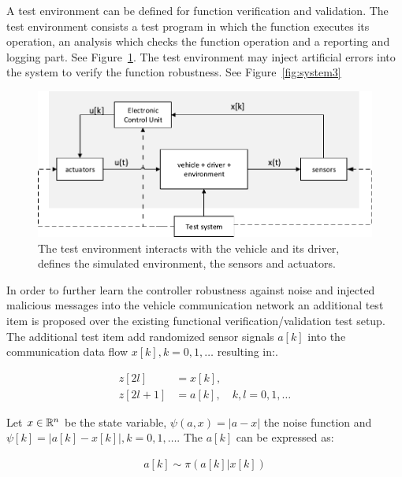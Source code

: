 \documentclass[a4paper, fleqn]{template/cas-dc}
\begin{document}
	A test environment can be defined for function verification and validation. The test environment consists a test program in which the function executes its operation, an analysis which checks the function operation and a reporting and logging part. See Figure~\ref{fig:system2}. The test environment may inject artificial errors into the system to verify the function robustness. See Figure~\ref{fig:system3}
	
	\begin{figure}[h]
		\begin{center}
			\includegraphics[scale=0.5]{figures/system2_.pdf}
			\caption{The test environment interacts with the vehicle and its driver, defines the simulated environment, the sensors and actuators.}
			\label{fig:system2}
		\end{center}
	\end{figure}
	
	In order to further learn the controller robustness against noise and injected malicious messages into the vehicle communication network an additional test item is proposed over the existing functional verification/validation test setup. The additional test item add randomized sensor signals $a[k]$ into the communication data flow $x[k], k=0, 1, \ldots$ resulting in:.
	
	\begin{equation}
		\begin{aligned}
			z[2l] &= x[k], \\
			z[2l+1] &= a[k], \quad k, l = 0, 1, \dots
		\end{aligned}
	\end{equation}
	
	
	Let $x\in\mathbb R^n$ be the state variable, $\psi(a, x) = |a-x|$ the noise function and $\psi[k] = |a[k] - x[k]|, k=0,1,\ldots$. The $a[k]$ can be expressed as:
	
	\begin{align}
		a[k] \sim \pi(a[k]|x[k])
	\end{align}
	
\end{document}
